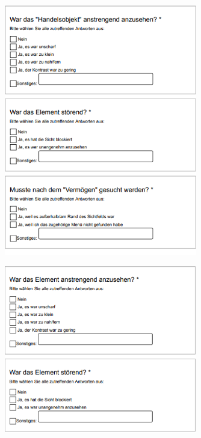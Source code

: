 	\begin{figure}[htbp]
		\centering
		\includegraphics[width=0.75\textwidth]{Fragen/7Szenario.png}
	\end{figure}

	\begin{figure}[htbp]
		\centering
		\includegraphics[width=0.75\textwidth]{Fragen/8Szenario.png}
	\end{figure}